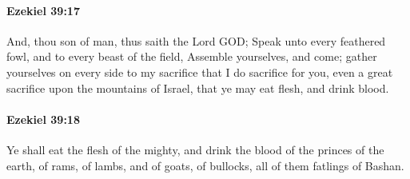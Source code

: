 		\paragraph{Ezekiel 39:17} %
			\label{EZEKIEL-39-17}

			And, thou son of man, thus saith the Lord GOD; Speak unto every feathered fowl, and to every beast of the field, Assemble yourselves, and come; gather yourselves on every side to my sacrifice that I do sacrifice for you, even a great sacrifice upon the mountains of Israel, that ye may eat flesh, and drink blood.


		\paragraph{Ezekiel 39:18} %
			\label{EZEKIEL-39-18}

			Ye shall eat the flesh of the mighty, and drink the blood of the princes of the earth, of rams, of lambs, and of goats, of bullocks, all of them fatlings of Bashan.

